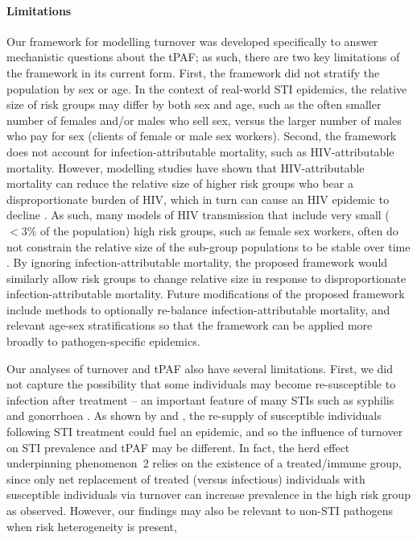\paragraph{Limitations}
Our framework for modelling turnover was developed
specifically to answer mechanistic questions about the tPAF;
as such, there are two key limitations of the framework in its current form.
First, the framework did not stratify the population by sex or age.
In the context of real-world STI epidemics,
the relative size of risk groups may differ by both sex and age,
such as the often smaller number of females and/or males who sell sex,
versus the larger number of males who pay for sex (clients of female or male sex workers).
Second, the framework does not account for
infection-attributable mortality, such as HIV-attributable mortality.
However, modelling studies have shown that HIV-attributable mortality can reduce the
relative size of higher risk groups who bear a disproportionate burden of HIV,
which in turn can cause an HIV epidemic to decline \citep{Boily1997}.
As such, many models of HIV transmission that include
very small ($<3\%$ of the population) high risk groups, such as female sex workers,
often do not constrain the relative size
of the sub-group populations to be stable over time \citep{Pickles2013}.
By ignoring infection-attributable mortality,
the proposed framework would similarly allow risk groups to change relative size
in response to disproportionate infection-attributable mortality.
Future modifications of the proposed framework include methods to optionally re-balance
infection-attributable mortality, and relevant age-sex stratifications so that
the framework can be applied more broadly to pathogen-specific epidemics.
\par
Our analyses of turnover and tPAF also have several limitations.
First, we did not capture the possibility that some individuals may become
re-susceptible to infection after treatment
-- an important feature of many STIs such as syphilis and gonorrhoea \citep{Fenton2008}.
As shown by \citet{Fenton2008} and \citet{Pourbohloul2003},
the re-supply of susceptible individuals following STI treatment
could fuel an epidemic, and so the influence of turnover on
STI prevalence and tPAF may be different.
In fact, the herd effect underpinning phenomenon~2
relies on the existence of a treated/immune group,
since only net replacement of treated (versus infectious) individuals
with susceptible individuals via turnover can increase prevalence
in the high risk group as observed.
However, our findings may also be relevant to non-STI pathogens when risk heterogeneity is present,
